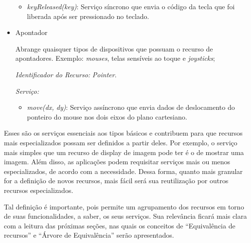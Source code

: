 \begin{itemize}
\begin{itemize}
			\item \emph{keyReleased(key)}: Serviço síncrono que envia o código da tecla que foi liberada após ser pressionado no teclado.
		\end{itemize}

	\item Apontador
		
		Abrange quaisquer tipos de dispositivos que possuam o recurso de apontadores. Exemplo: \emph{mouses}, telas sensíveis ao toque e \emph{joysticks};

		\emph{Identificador do Recurso:} \emph{Pointer}.

		\emph{Serviço:}
		\begin{itemize}
			\item \emph{move(dx, dy)}: Serviço assíncrono que envia dados de deslocamento do ponteiro do mouse nos dois eixos do plano cartesiano.
		\end{itemize}

\end{itemize}

Esses são os serviços essenciais aos tipos básicos e contribuem para que recursos mais especializados possam ser definidos a partir deles. Por exemplo, o serviço mais simples que um recurso de display de imagem pode ter é o de mostrar uma imagem. Além disso, as aplicações podem requisitar serviços mais ou menos especializados, de acordo com a necessidade. Dessa forma, quanto mais granular for a definição de novos recursos, mais fácil será sua reutilização por outros recursos especializados. 

Tal definição é importante, pois permite um agrupamento dos recursos em torno de suas funcionalidades, a saber, os seus serviços. Sua relevância ficará mais clara com a leitura das próximas seções, nas quais os conceitos de ``Equivalência de recursos'' e ``Árvore de Equivalência'' serão apresentados.




